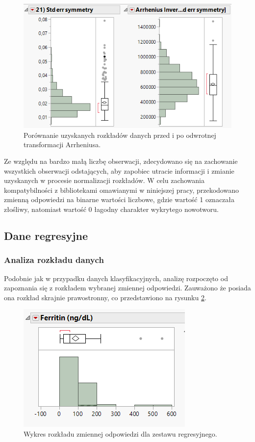 	\begin{figure}[!ht]
		\centering
		\includegraphics[width=0.7\linewidth]{Rysunki/Rozdzial3/arrhenius}
		\caption{Porównanie uzyskanych rozkładów danych przed i po odwrotnej transformacji Arrheniusa.}
		\label{fig:arrhenius}
	\end{figure}
	
	Ze względu na bardzo małą liczbę obserwacji, zdecydowano się na zachowanie wszystkich obserwacji odstających, aby zapobiec utracie informacji i zmianie uzyskanych w procesie normalizacji rozkładów. W celu zachowania kompatybilności z bibliotekami omawianymi w niniejszej pracy, przekodowano zmienną odpowiedzi na binarne wartości liczbowe, gdzie wartość 1 oznaczała złośliwy, natomiast wartość 0 łagodny charakter wykrytego nowotworu.

	\subsection{Dane regresyjne}
	
	\subsubsection{Analiza rozkładu danych}
	
	Podobnie jak w przypadku danych klasyfikacyjnych, analizę rozpoczęto od zapoznania się z rozkładem wybranej zmiennej odpowiedzi. Zauważono że posiada ona rozkład skrajnie prawostronny, co przedstawiono na rysunku \ref{fig:ferritin}.
	
	\begin{figure}[!ht]
		\centering
		\includegraphics[width=0.5\linewidth]{Rozdzial3/ferritin}
		\caption{Wykres rozkładu zmiennej odpowiedzi dla zestawu regresyjnego.}
		\label{fig:ferritin}
	\end{figure}
	

